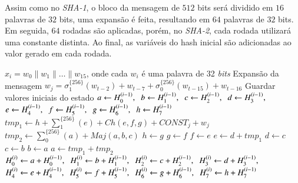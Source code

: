 \documentclass{SBCbookchapter}
\begin{document}
\begin{otherlanguage}{brazilian}
{	Assim como no \textit{SHA-1}, o bloco da mensagem de $512$ bits será dividido em $16$ palavras de $32$ bits, uma expansão é feita, resultando em $64$ palavras de $32$ bits. 
	Em seguida, $64$ rodadas são aplicadas, porém, no \textit{SHA-2}, cada rodada utilizará uma constante distinta. 
	Ao final, as variáveis do hash  inicial são adicionadas ao valor gerado em cada rodada.
	\begin{algorithm}
	\caption{SHA-256}
	\begin{algorithmic}
		\State $x_i = w_0\|w_1\|\ldots\|w_{15}$, onde cada $w_i$ é uma palavra de 32 \emph{bits}
		\State Expansão da mensagem
			\State $w_j = \sigma_1^{\{256\}}(w_{t-2}) + w_{t-7} + \sigma_0^{\{256\}}(w_{t-15}) + w_{t-16}$
		\EndFor
		\State Guardar valores iniciais do estado
		\State $a \leftarrow H_0^{(i-1)}, \hspace{2mm} b \leftarrow H_1^{(i-1)}, \hspace{2mm} c \leftarrow H_2^{(i-1)}, \hspace{2mm} d \leftarrow H_3^{(i-1)},$
		\State $e \leftarrow H_4^{(i-1)}, \hspace{2mm} f \leftarrow H_5^{(i-1)}, \hspace{2mm} g \leftarrow H_6^{(i-1)}, \hspace{2mm} h \leftarrow H_7^{(i-1)}$ 
			\State $tmp_1 \leftarrow h + \sum_1^{\{256\}}(e) + Ch(e,f,g) + CONST_j + w_j$
			\State $tmp_2 \leftarrow \sum_0^{\{256\}}(a) + Maj(a,b,c)$
			\State $h \leftarrow g$
			\State $g \leftarrow f$
			\State $f \leftarrow e$
			\State $e \leftarrow d + tmp_1$
			\State $d \leftarrow c$
			\State $c \leftarrow b$
			\State $b \leftarrow a$
			\State $a \leftarrow tmp_1 + tmp_2$
		\EndFor	
		\State $H_0^{(i)} \leftarrow a+H_0^{(i-1)}, \hspace{2mm} H_1^{(i)} \leftarrow b+H_1^{(i-1)}, \hspace{2mm} H_2^{(i)} \leftarrow c+H_2^{(i-1)}, \hspace{2mm} H_3^{(i)} \leftarrow d+H_3^{(i-1)},$
		\State $H_4^{(i)} \leftarrow e+H_4^{(i-1)}, \hspace{2mm} H_5^{(i)} \leftarrow f+H_5^{(i-1)}, \hspace{2mm} H_6^{(i)} \leftarrow g+H_6^{(i-1)}, \hspace{2mm} H_7^{(i)} \leftarrow h+H_7^{(i-1)}$
	\EndFor
	\State {}
\end{algorithmic}
\label{alg: Algoritmo SHA-2 (256)}	
\end{algorithm} 

}
\end{otherlanguage}
\end{document}
